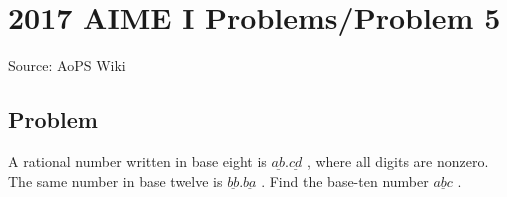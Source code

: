 \documentclass[12pt]{article}
\begin{document}
\section*{{2017 AIME I Problems/Problem 5}}
Source: AoPS Wiki

\subsection*{Problem}
A rational number written in base eight is $\underline{ab} . \underline{cd}$ , where all digits are nonzero. The same number in base twelve is $\underline{bb} . \underline{ba}$ . Find the base-ten number $\underline{abc}$ .
\end{document}
